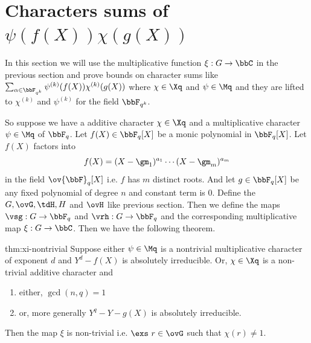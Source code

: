 \section{Characters sums of \texorpdfstring{$\psi(f(X))\chi(g(X))$}{Ψ(f(X))χ(g(X))}}
In this section we will use the multiplicative function $\xi:G\to \bbC$ in the previous section and prove bounds on character sums like $\sum_{\alpha\in\bbF_{q^k}}\psi^{(k)}(f(X))\chi^{(k)}(g(X))$ where $\chi\in\Xq$ and $\psi\in\Mq$ and they are lifted to $\chi^{(k)}$ and $\psi^{(k)}$ for the field $\bbF_{q^k}$. 

So suppose we have a additive character $\chi\in\Xq$ and a multiplicative character $\psi\in\Mq$ of $\bbF_q$. Let $f(X)\in\bbF_q[X]$ be a monic polynomial in $\bbF_q[X]$. Let $f(X)$ factors into $$f(X)=(X-\gm_1)^{a_1}\cdots (X-\gm_m)^{a_m}$$ in the field $\ov{\bbF}_q[X]$ i.e. $f$ has $m$ distinct roots. And let $g\in\bbF_q[X]$ be any fixed polynomial of degree $n$ and constant term is $0$. Define the $G, \ovG, \tdH, H$ and $\ovH$ like previous section. Then we define the maps $\vsg:G\to \bbF_q$ and $\vrh:G\to\bbF_q$ and the corresponding multiplicative map $\xi:G\to\bbC$. Then we have the following theorem.
\begin{Theorem}{}{thm:xi-nontrivial}
  Suppose either $\psi\in\Mq$ is a nontrivial multiplicative character of exponent $d$ and $Y^d-f(X)$ is absolutely irreducible. Or, $\chi\in\Xq$ is a non-trivial additive character and 
  \begin{enumerate}[label=(\roman*)]
    \item either, $\gcd(n,q)=1$ 
    \item or, more generally $Y^q-Y-g(X)$ is absolutely irreducible.
  \end{enumerate}
  Then the map $\xi$ is non-trivial i.e. $\exs\ r\in \ovG$ such that $\chi(r)\neq 1$. 
\end{Theorem}
